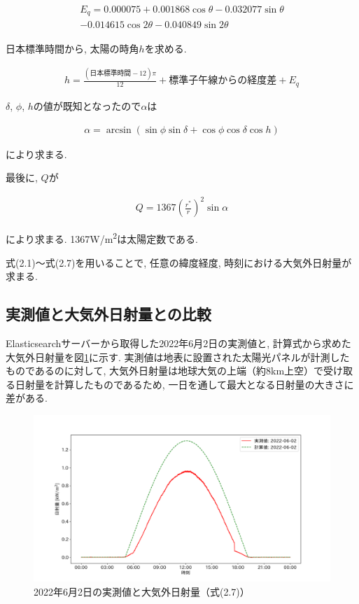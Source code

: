\begin{eqnarray}
  \begin{split}
    E_q =  0.000075+0.001868\cos \theta-0.032077\sin \theta\\
    -0.014615\cos 2\theta-0.040849\sin 2\theta
  \end{split}
\end{eqnarray}

日本標準時間から, 太陽の時角$h$を求める.

\begin{eqnarray}
  h = \frac{(日本標準時間-12)\pi}{12}+標準子午線からの経度差+E_q
\end{eqnarray}

$\delta$, $\phi$, $h$の値が既知となったので$\alpha$は

\begin{eqnarray}
  \alpha = \arcsin (\sin \phi\sin \delta+\cos \phi\cos \delta\cos h)
\end{eqnarray}

により求まる.

最後に, $Q$が

\begin{eqnarray}
  Q = 1367(\frac{r^{*}}{r})^{2}\sin \alpha
\end{eqnarray}

により求まる. 1367\si{\watt}/\si{\metre\squared}は太陽定数である.

式(2.1)～式(2.7)を用いることで, 任意の緯度経度, 時刻における大気外日射量が求まる.


\subsection{実測値と大気外日射量との比較}
Elasticsearchサーバーから取得した2022年6月2日の実測値と, 計算式から求めた大気外日射量を図\ref{20220529-p1}に示す. 実測値は地表に設置された太陽光パネルが計測したものであるのに対して, 大気外日射量は地球大気の上端（約8km上空）で受け取る日射量を計算したものであるため, 一日を通して最大となる日射量の大きさに差がある.

\begin{figure}[H]
  \begin{center}
    \includegraphics[width=160mm]{sotu/figure/2/original-20220602-corr.png}
    \caption{2022年6月2日の実測値と大気外日射量（式(2.7)）}
    \label{20220529-p1}
  \end{center}
\end{figure}

